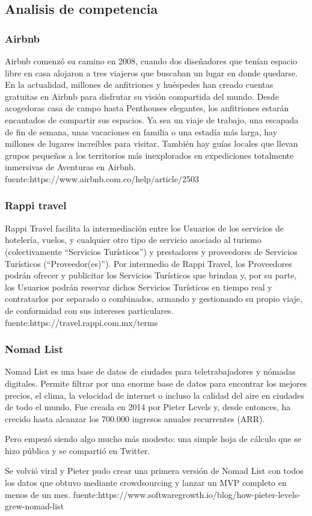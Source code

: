 \subsection{Analisis de competencia}

\subsubsection*{Airbnb}
Airbnb comenzó su camino en 2008, cuando dos diseñadores que tenían espacio libre en casa alojaron a tres viajeros que buscaban un lugar en donde quedarse. En la actualidad, millones de anfitriones y huéspedes han creado cuentas gratuitas en Airbnb para disfrutar su visión compartida del mundo.
Desde acogedoras casa de campo hasta Penthouses elegantes, los anfitriones estarán encantados de compartir sus espacios. Ya sea un viaje de trabajo, una escapada de fin de semana, unas vacaciones en familia o una estadía más larga, hay millones de lugares increíbles para visitar.
También hay guías locales que llevan grupos pequeños a los territorios más inexplorados en expediciones totalmente inmersivas de Aventuras en Airbnb.
fuente:https://www.airbnb.com.co/help/article/2503

\subsubsection*{Rappi travel}
Rappi Travel facilita la intermediación entre los Usuarios de los servicios de hotelería, vuelos, y cualquier otro tipo de servicio asociado al turismo (colectivamente “Servicios Turísticos”) y prestadores y proveedores de Servicios Turísticos (“Proveedor(es)”). Por intermedio de Rappi Travel, los Proveedores podrán ofrecer y publicitar los Servicios Turísticos que brindan y, por su parte, los Usuarios podrán reservar dichos Servicios Turísticos en tiempo real y contratarlos por separado o combinados, armando y gestionando su propio viaje, de conformidad con sus intereses particulares.
fuente:https://travel.rappi.com.mx/terms

\subsubsection*{Nomad List}
Nomad List es una base de datos de ciudades para teletrabajadores y nómadas digitales. Permite filtrar por una enorme base de datos para encontrar los mejores precios, el clima, la velocidad de internet o incluso la calidad del aire en ciudades de todo el mundo.
Fue creada en 2014 por Pieter Levels y, desde entonces, ha crecido hasta alcanzar los 700.000 ingresos anuales recurrentes (ARR).

Pero empezó siendo algo mucho más modesto: una simple hoja de cálculo que se hizo pública y se compartió en Twitter.

Se volvió viral y Pieter pudo crear una primera versión de Nomad List con todos los datos que obtuvo mediante crowdsourcing y lanzar un MVP completo en menos de un mes.
fuente:https://www.softwaregrowth.io/blog/how-pieter-levels-grew-nomad-list


